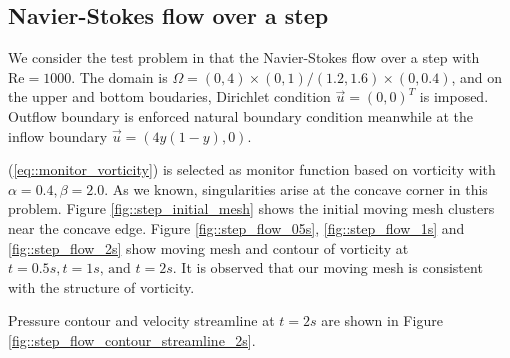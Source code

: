 \documentclass[a4paper, 11pt]{article}
\begin{document}

   \subsection{Navier-Stokes flow over a step}

      We consider the test problem in \cite{zheng2010posteriori} that the
      Navier-Stokes flow over a step with $\text{Re} = 1000$. The
      domain is $\Omega = (0, 4) \times (0, 1)/(1.2, 1.6) \times (0,
      0.4)$, and on the upper and bottom boudaries, Dirichlet
      condition $\vec{u} = (0, 0)^T$ is imposed. Outflow boundary is
      enforced natural boundary condition meanwhile at the inflow
      boundary $\vec{u} = (4 y (1 - y), 0)$.

      (\ref{eq::monitor_vorticity}) is selected as monitor function
      based on vorticity with $\alpha = 0.4, \beta = 2.0$. As we
      known, singularities arise at the concave corner in this
      problem. Figure \ref{fig::step_initial_mesh} shows the initial
      moving mesh clusters near the concave edge. Figure
      \ref{fig::step_flow_05s}, \ref{fig::step_flow_1s} and
      \ref{fig::step_flow_2s} show moving mesh and contour of
      vorticity at $t = 0.5s, t = 1s \text{, and } t = 2s$. It is
      observed that our moving mesh is consistent with the structure of
      vorticity.

      Pressure contour and velocity streamline at $t = 2s$ are shown
      in Figure \ref{fig::step_flow_contour_streamline_2s}.      
       
\end{document}
